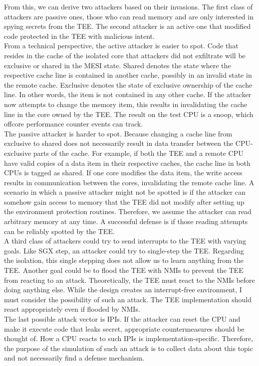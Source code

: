 From this, we can derive two attackers based on their invasions. The first class
of attackers are passive ones, those who can read memory and are only interested
in spying secrets from the TEE. The second attacker is an active one that
modified code protected in the TEE with malicious intent.\\

From a technical perspective, the active attacker is easier to spot. Code that
resides in the cache of the isolated core that attackers did not exfiltrate will
be exclusive or shared in the MESI state. Shared denotes the state where the
respective cache line is contained in another cache, possibly in an invalid
state in the remote cache. Exclusive denotes the state of exclusive ownership of
the cache line. In other words, the item is not contained in any other cache. If
the attacker now attempts to change the memory item, this results in
invalidating the cache line in the core owned by the TEE. The result on the test
CPU is a snoop, which offcore performance counter events can track.\\

The passive attacker is harder to spot. Because changing a cache line from
exclusive to shared does not necessarily result in data transfer between the
CPU-exclusive parts of the cache. For example, if both the TEE and a remote CPU
have valid copies of a data item in their respective caches, the cache line in
both CPUs is tagged as shared. If one core modifies the data item, the write
access results in communication between the cores, invalidating the remote cache
line. A scenario in which a passive attacker might not be spotted is if the
attacker can somehow gain access to memory that the TEE did not modify after
setting up the environment protection routines. Therefore, we assume the
attacker can read arbitrary memory at any time. A successful defense is if those
reading attempts can be reliably spotted by the TEE.\\

A third class of attackers could try to send interrupts to the TEE with varying
goals. Like SGX step, an attacker could try to single-step the TEE.
Regarding the isolation, this single stepping does not allow us to learn
anything from the TEE. Another goal could be to flood the TEE with NMIs to
prevent the TEE from reacting to an attack. Theoretically, the TEE must react to
the NMIs before doing anything else. While the design creates an interrupt-free
environment, I must consider the possibility of such an attack. The TEE
implementation should react appropriately even if flooded by NMIs.\\

The last possible attack vector is IPIs. If the attacker can reset the CPU and
make it execute code that leaks secret, appropriate countermeasures should be
thought of. How a CPU reacts to such IPIs is implementation-specific. Therefore,
the purpose of the simulation of such an attack is to collect data about this
topic and not necessarily find a defense mechanism.\\

\cleardoublepage

